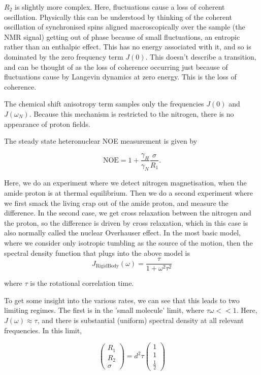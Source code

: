 \documentclass[showkeys,aps,prb,prepreint,amssymb, amsmath,nobibnotes]{article}
\begin{document}
$R_2$ is slightly more complex. Here, fluctuations cause a loss of coherent oscillation. Physically this can be understood by thinking of the coherent oscillation of synchronised spins aligned macroscopically over the sample (the NMR signal) getting out of phase because of small fluctuations, an entropic rather than an enthalpic effect. This has no energy associated with it, and so is dominated by the zero frequency term $J(0)$. This doesn't describe a transition, and can be thought of as the loss of coherence occurring just because of fluctuations cause by Langevin dynamics at zero energy. This is the loss of coherence.

The chemical shift anisotropy term samples only the frequencies $J(0)$ and $J(\omega_N)$. Because this mechanism is restricted to the nitrogen, there is no appearance of proton fields. 

The steady state heteronuclear NOE measurement is given by

\begin{equation}
  \mathrm{NOE}=1+ \frac{\gamma_H}{\gamma_N}\frac{\sigma}{R_1}.
  \label{eqNOE}
\end{equation}

Here, we do an experiment where we detect nitrogen magnetisation, when the amide proton is at thermal equilibrium. Then we do a second experiment where we first smack the living crap out of the amide proton, and measure the difference. In the second case, we get cross relaxation between the nitrogen and the proton, so the difference is driven by cross relaxation, which in this case is also normally called the nuclear Overhauser effect. In the most basic model, where we consider only isotropic tumbling as the source of the motion, then the spectral density function that plugs into the above model is
\begin{equation}
J_{\mathrm{RigidBody}}(\omega)=\frac{\tau}{1+\omega^2 \tau^2}
  \end{equation}

where $\tau$ is the rotational correlation time.

To get some insight into the various rates, we can see that this leads to two limiting regimes. The first is in the 'small molecule' limit, where $\tau \omega << 1$. Here, $J(\omega)\approx\tau$, and there is substantial (uniform) spectral density at all relevant frequencies. In this limit,

\begin{equation}
    \left(\begin{array}{c} R_1 \\R_2 \\ \sigma \end{array}\right)
    =
    d^2 \tau \left(\begin{array}{c} 1 \\ 1 \\ \frac{1}{2}  \end{array}\right)
  \end{equation}
\end{document}
